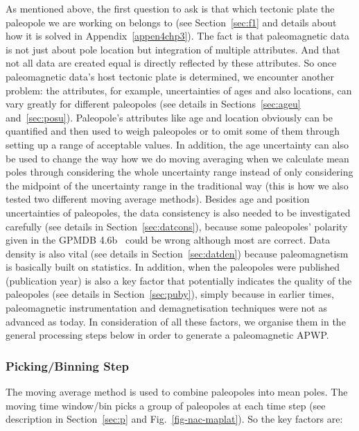 As mentioned above, the first question to ask is that which tectonic plate the
paleopole we are working on belongs to (see Section~\ref{sec:f1} and details
about how it is solved in Appendix~\ref{appen4chp3}). The fact is that
paleomagnetic data is not just about pole location but integration of multiple
attributes. And that not all data are created equal is directly reflected by
these attributes. So once paleomagnetic data's host tectonic plate is
determined, we encounter another problem: the attributes, for example,
uncertainties of ages and also locations, can vary greatly for different
paleopoles (see details in Sections~\ref{sec:ageu} and~\ref{sec:posu}).
Paleopole's attributes like age and location obviously can be quantified and
then used to weigh paleopoles or to omit some of them through setting up a range
of acceptable values. In addition, the age uncertainty can also be used to
change the way how we do moving averaging when we calculate mean poles through
considering the whole uncertainty range instead of only considering the midpoint
of the uncertainty range in the traditional way (this is how we also tested two
different moving average methods). Besides age and position uncertainties of
paleopoles, the data consistency is also needed to be investigated carefully
(see details in Section~\ref{sec:datcons}), because some paleopoles' polarity
given in the GPMDB 4.6b~\cite[updated in 2016 by the Ivar Giaever Geomagnetic
Laboratory team, in collaboration with Pisarevsky]{M96,P05} could be wrong
although most are correct. Data density is also vital (see details in
Section~\ref{sec:datden}) because paleomagnetism is basically built on
statistics. In addition, when the paleopoles were published (publication year)
is also a key factor that potentially indicates the quality of the paleopoles
(see details in Section~\ref{sec:puby}), simply because in earlier times,
paleomagnetic instrumentation and demagnetisation techniques were not as
advanced as today. In consideration of all these factors, we organise them in
the general processing steps below in order to generate a paleomagnetic APWP\@.

\subsubsection{Picking/Binning Step}

The moving average method is used to combine paleopoles into mean poles. The
moving time window/bin picks a group of paleopoles at each time step (see
description in Section~\ref{sec:p} and Fig.~\ref{fig-nac-maplat}). So the key
factors are:


